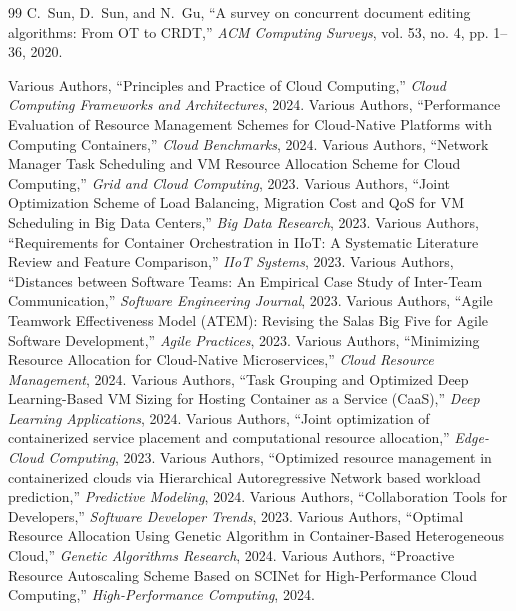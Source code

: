 \documentclass[12pt,a4paper]{report}
\begin{document}
{\begin{thebibliography}{99}
			C.~Sun, D.~Sun, and N.~Gu,
			``A survey on concurrent document editing algorithms: From OT to CRDT,''
			\textit{ACM Computing Surveys}, vol. 53, no. 4, pp. 1--36, 2020.
			
			
			 Various Authors, ``Principles and Practice of Cloud Computing,'' \textit{Cloud Computing Frameworks and Architectures}, 2024.
			 Various Authors, ``Performance Evaluation of Resource Management Schemes for Cloud-Native Platforms with Computing Containers,'' \textit{Cloud Benchmarks}, 2024.
			 Various Authors, ``Network Manager Task Scheduling and VM Resource Allocation Scheme for Cloud Computing,'' \textit{Grid and Cloud Computing}, 2023.
			 Various Authors, ``Joint Optimization Scheme of Load Balancing, Migration Cost and QoS for VM Scheduling in Big Data Centers,'' \textit{Big Data Research}, 2023.
			 Various Authors, ``Requirements for Container Orchestration in IIoT: A Systematic Literature Review and Feature Comparison,'' \textit{IIoT Systems}, 2023.
			 Various Authors, ``Distances between Software Teams: An Empirical Case Study of Inter-Team Communication,'' \textit{Software Engineering Journal}, 2023.
			 Various Authors, ``Agile Teamwork Effectiveness Model (ATEM): Revising the Salas Big Five for Agile Software Development,'' \textit{Agile Practices}, 2023.
			 Various Authors, ``Minimizing Resource Allocation for Cloud-Native Microservices,'' \textit{Cloud Resource Management}, 2024.
			 Various Authors, ``Task Grouping and Optimized Deep Learning-Based VM Sizing for Hosting Container as a Service (CaaS),'' \textit{Deep Learning Applications}, 2024.
			 Various Authors, ``Joint optimization of containerized service placement and computational resource allocation,'' \textit{Edge-Cloud Computing}, 2023.
			 Various Authors, ``Optimized resource management in containerized clouds via Hierarchical Autoregressive Network based workload prediction,'' \textit{Predictive Modeling}, 2024.
			 Various Authors, ``Collaboration Tools for Developers,'' \textit{Software Developer Trends}, 2023.
			 Various Authors, ``Optimal Resource Allocation Using Genetic Algorithm in Container-Based Heterogeneous Cloud,'' \textit{Genetic Algorithms Research}, 2024.
			 Various Authors, ``Proactive Resource Autoscaling Scheme Based on SCINet for High-Performance Cloud Computing,'' \textit{High-Performance Computing}, 2024.

\end{thebibliography}}
\end{document}
